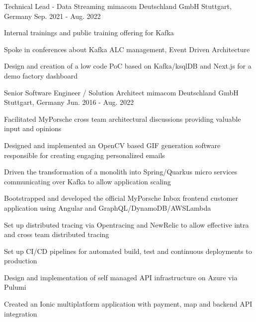 \begin{cventries}
  \cventry
    {Technical Lead - Data Streaming} %
    {mimacom Deutschland GmbH} %
    {Stuttgart, Germany} %
    {Sep. 2021 - Aug. 2022} %
    {
      \begin{cvitems} %
        \item {Internal trainings and public training offering for Kafka}
        \item {Spoke in conferences about Kafka ALC management, Event Driven Architecture}
        \item {Design and creation of a low code PoC based on Kafka/ksqlDB and Next.js for a demo factory dashboard}
      \end{cvitems}
    }

  \cventry
    {Senior Software Engineer / Solution Architect} %
    {mimacom Deutschland GmbH} %
    {Stuttgart, Germany} %
    {Jun. 2016 - Aug. 2022} %
    {
      \begin{cvitems} %
        \item {Facilitated MyPorsche cross team architectural discussions providing valuable input and opinions}
        \item {Designed and implemented an OpenCV based GIF generation software responsible for creating engaging personalized emails}
        \item {Driven the transformation of a monolith into Spring/Quarkus micro services communicating over Kafka to allow application scaling}
        \item {Bootstrapped and developed the official MyPorsche Inbox frontend customer application using Angular and GraphQL/DynamoDB/AWSLambda}
        \item {Set up distributed tracing via Opentracing and NewRelic to allow effective intra and cross team distributed tracing}
        \item {Set up CI/CD pipelines for automated build, test and continuous deployments to production}
        \item {Design and implementation of self managed API infrastructure on Azure via Pulumi}
        \item {Created an Ionic multiplatform application with payment, map and backend API integration}
      \end{cvitems}
    }


\end{cventries}

